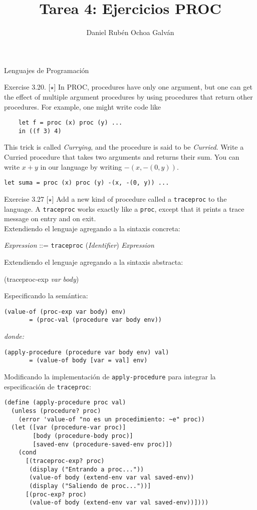 \documentclass{article}
\title{Tarea 4: Ejercicios PROC}
\author{Daniel Rubén Ochoa Galván}
\begin{document}
\maketitle
\begin{center}
	Lenguajes de Programación
\end{center}

Exercise 3.20. [$\star$] In PROC, procedures have only one argument, but one can get the effect of multiple argument procedures by using procedures that return other procedures. For example, one might write code like

\begin{Verbatim}
	let f = proc (x) proc (y) ...
	in ((f 3) 4)
\end{Verbatim}

This trick is called \emph{Currying}, and the procedure is said to be \emph{Curried}. Write a Curried procedure that takes two arguments and returns their sum. You can write $x + y$ in our language by writing $-(x, -(0, y))$.


\begin{Verbatim}[fontfamily=helvetica, frame=lines]
		let suma = proc (x) proc (y) -(x, -(0, y)) ...
\end{Verbatim}

Exercise 3.27 [$\star$] Add a new kind of procedure called a \texttt{traceproc} to the language. A \texttt{traceproc} works exactly like a \texttt{proc}, except that it prints a trace message on entry and on exit. \\
Extendiendo el lenguaje agregando a la sintaxis concreta:
\begin{center}
\emph{Expression}  ::=  \texttt{traceproc} (\emph{Identifier}) \emph{Expression}
\end{center}
Extendiendo el lenguaje agregando a la sintaxis abstracta:
\begin{center}
(traceproc-exp \emph{var} \emph{body})
\end{center}
Especificando la semántica:
\begin{Verbatim}[fontfamily=helvetica, frame=topline]
	(value-of (proc-exp var body) env)
	   = (proc-val (procedure var body env))
\end{Verbatim}
\emph{donde:}
\begin{Verbatim}[fontfamily=helvetica, frame=bottomline]
	(apply-procedure (procedure var body env) val)
	   = (value-of body [var = val] env)
\end{Verbatim}
Modificando la implementación de \texttt{apply-procedure} para integrar la especificación de \texttt{traceproc}:

\begin{Verbatim}[fontfamily=helvetica, frame=lines]
(define (apply-procedure proc val)
  (unless (procedure? proc)
    (error 'value-of "no es un procedimiento: ~e" proc))
  (let ([var (procedure-var proc)]
        [body (procedure-body proc)]
        [saved-env (procedure-saved-env proc)])
    (cond
      [(traceproc-exp? proc)
       (display ("Entrando a proc..."))
       (value-of body (extend-env var val saved-env))
       (display ("Saliendo de proc..."))]
      [(proc-exp? proc)
       (value-of body (extend-env var val saved-env))])))
\end{Verbatim}
\end{document}
